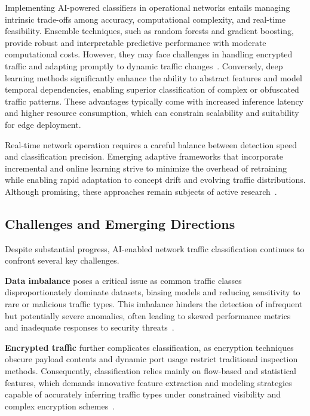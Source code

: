 \documentclass[sigconf]{acmart}
\begin{document}
Implementing AI-powered classifiers in operational networks entails managing intrinsic trade-offs among accuracy, computational complexity, and real-time feasibility. Ensemble techniques, such as random forests and gradient boosting, provide robust and interpretable predictive performance with moderate computational costs. However, they may face challenges in handling encrypted traffic and adapting promptly to dynamic traffic changes~\cite{ref51}. Conversely, deep learning methods significantly enhance the ability to abstract features and model temporal dependencies, enabling superior classification of complex or obfuscated traffic patterns. These advantages typically come with increased inference latency and higher resource consumption, which can constrain scalability and suitability for edge deployment.

Real-time network operation requires a careful balance between detection speed and classification precision. Emerging adaptive frameworks that incorporate incremental and online learning strive to minimize the overhead of retraining while enabling rapid adaptation to concept drift and evolving traffic distributions. Although promising, these approaches remain subjects of active research~\cite{ref51}.

\subsection{Challenges and Emerging Directions}

Despite substantial progress, AI-enabled network traffic classification continues to confront several key challenges.

\textbf{Data imbalance} poses a critical issue as common traffic classes disproportionately dominate datasets, biasing models and reducing sensitivity to rare or malicious traffic types. This imbalance hinders the detection of infrequent but potentially severe anomalies, often leading to skewed performance metrics and inadequate responses to security threats~\cite{ref51}.

\textbf{Encrypted traffic} further complicates classification, as encryption techniques obscure payload contents and dynamic port usage restrict traditional inspection methods. Consequently, classification relies mainly on flow-based and statistical features, which demands innovative feature extraction and modeling strategies capable of accurately inferring traffic types under constrained visibility and complex encryption schemes~\cite{ref51}.
\end{document}
